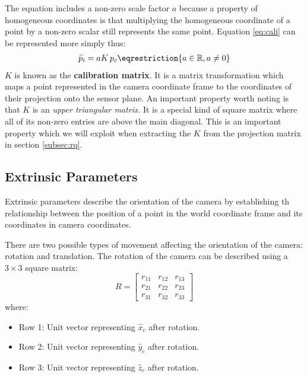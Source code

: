 The equation includes a non-zero scale factor $a$ because a property of homogeneous coordinates is that multiplying the homogeneous coordinate of a point by a non-zero scalar still represents the same point. Equation \ref{eq:cali} can be represented more simply thus:
\begin{gather}
    \widetilde{p}_i = aK\, p_c \label{eq:pi} \eqrestriction{a \in \Real, a \neq 0}
\end{gather}
$K$ is known as the \textbf{calibration matrix}. It is a matrix transformation which maps a point represented in the camera coordinate frame to the coordinates of their projection onto the sensor plane. An important property worth noting is that $K$ is an \emph{upper triangular matrix}. It is a special kind of square matrix where all of its non-zero entries are above the main diagonal. This is an important property which we will exploit when extracting the $K$ from the projection matrix in section \ref{subsec:rq}.

\subsection{Extrinsic Parameters} \label{sec:extrinsics}

Extrinsic parameters describe the orientation of the camera by establishing th relationship between the position of a point in the world coordinate frame and its coordinates in camera coordinates.

There are two possible types of movement affecting the orientation of the camera: rotation and translation. The rotation of the camera can be described using a $3 \times 3$ square matrix:
\begin{equation}
    R =
    \begin{bmatrix}
        r_{11} & r_{12} & r_{13} \\
        r_{21} & r_{22} & r_{23} \\
        r_{31} & r_{32} & r_{33}
    \end{bmatrix}
\end{equation}
\noindent where:
\begin{itemize}
    \item Row 1: Unit vector representing $\hat{x}_c$ after rotation.
    \item Row 2: Unit vector representing $\hat{y}_c$ after rotation.
    \item Row 3: Unit vector representing $\hat{z}_c$ after rotation.
\end{itemize}

